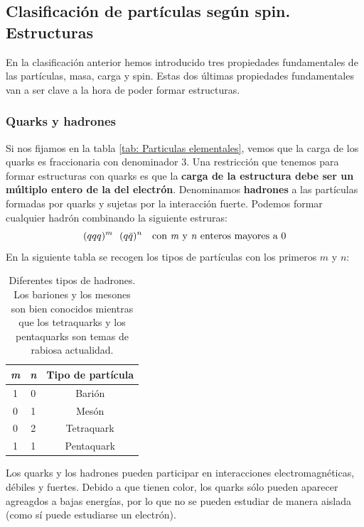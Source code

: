 \subsection{Clasificación de partículas según spin. Estructuras}
En la clasificación anterior hemos introducido tres propiedades fundamentales de las partículas, masa, carga y spin. Estas dos últimas propiedades fundamentales van a ser clave a la hora de poder formar estructuras.
\subsubsection{Quarks y hadrones} \label{subsubsec: Quarks y hadrones}
Si nos fijamos en la tabla \ref{tab: Particulas elementales}, vemos que la carga de los quarks es fraccionaria con denominador 3. Una restricción que tenemos para formar estructuras con quarks es que la \textbf{carga de la estructura debe ser un múltiplo entero de la del electrón}. Denominamos \textbf{hadrones} a las partículas formadas por quarks y sujetas por la interacción fuerte. Podemos formar cualquier hadrón combinando la siguiente estruras:
\begin{equation}
    (qqq)^m \ \ (q\Bar{q})^n \quad \text{con \textit{m} y \textit{n} enteros mayores a 0}
    \label{eq: formula general de los hadrones}
\end{equation}
En la siguiente tabla se recogen los tipos de partículas con los primeros $m$ y $n$:
\begin{table}[h]
\centering
\begin{tabular}{|c|c|c|}
\hline
\textit{m} & \textit{n} & Tipo de partícula \\
\hline
1          & 0          & Barión            \\
\hline
0          & 1          & Mesón             \\
\hline \hline
0          & 2          & Tetraquark        \\
\hline
1          & 1          & Pentaquark        \\
\hline
\end{tabular}
\caption{Diferentes tipos de hadrones. Los bariones y los mesones son bien conocidos mientras que los tetraquarks y los pentaquarks son temas de rabiosa actualidad.}
\label{tab: hadrones}
\end{table}

Los quarks y los hadrones pueden participar en interacciones electromagnéticas, débiles y fuertes. Debido a que tienen color, los quarks sólo pueden aparecer agreagdos a bajas energías, por lo que no se pueden estudiar de manera aislada (como sí puede estudiarse un electrón).

